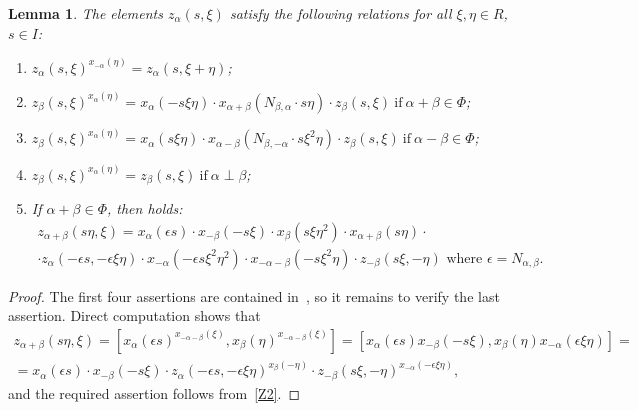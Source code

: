 \documentclass[oneside, 8pt]{amsart}
\newtheorem{lemma}{Lemma}
\theoremstyle{remark}
\theoremstyle{definition}
\numberwithin{lemma}{section}
\numberwithin{prop}{section}
\numberwithin{corollary}{section}
\numberwithin{equation}{section}
\begin{document}
\begin{lemma}\label{Zrels} The elements $z_\alpha(s, \xi)$ satisfy the following relations for all $\xi, \eta\in R$, $s\in I$:
\begin{enumerate} 
\item\label{Z1} $z_{\alpha}(s, \xi) ^ {x_{-\alpha}(\eta)} = z_{\alpha}(s, \xi + \eta)$;
\item\label{Z2} $z_{\beta}(s, \xi) ^ {x_{\alpha}(\eta)} = x_{\alpha} (- s\xi \eta) \cdot x_{\alpha+\beta} (N_{\beta, \alpha}\cdot s\eta)     \cdot z_{\beta}(s, \xi)\ \text{if}\ \alpha + \beta \in \Phi$;
\item\label{Z3} $z_{\beta}(s, \xi) ^ {x_{\alpha}(\eta)} = x_{\alpha} (s\xi \eta) \cdot x_{\alpha-\beta} (N_{\beta,-\alpha}\cdot s\xi^2\eta) \cdot z_{\beta}(s, \xi)\ \text{if}\ \alpha - \beta \in \Phi$;

\item\label{Z4} $z_{\beta}(s, \xi) ^ {x_{\alpha}(\eta)} = z_{\beta}(s, \xi)\ \text{if}\ \alpha\perp\beta$;
\item If $\alpha+\beta\in\Phi$, then holds:
\begin{multline} \label{Z5} z_{\alpha+\beta}(s\eta, \xi) = x_\alpha(\epsilon s)\cdot x_{-\beta}(-s\xi) \cdot x_{\beta}(s\xi\eta^2) \cdot x_{\alpha+\beta}(s \eta) \cdot \\ \cdot z_\alpha(-\epsilon s, -\epsilon \xi\eta) \cdot
  x_{-\alpha}(-\epsilon s\xi^2\eta^2) \cdot x_{-\alpha-\beta}(- s \xi^2 \eta) \cdot z_{-\beta}(s\xi, -\eta)\text{ where $\epsilon = N_{\alpha,\beta}$.}\end{multline}
\end{enumerate} \end{lemma}
\begin{proof}
The first four assertions are contained in~\cite[Lemma~9]{S15}, so it remains to verify the last assertion.
Direct computation shows that
\begin{multline} \nonumber
  z_{\alpha+\beta}(s\eta, \xi) = [x_\alpha(\epsilon s)^{x_{-\alpha-\beta}(\xi)}, x_\beta(\eta)^{x_{-\alpha-\beta}(\xi)}] =
  [x_\alpha(\epsilon s) x_{-\beta}(-s\xi), x_{\beta}(\eta) x_{-\alpha}(\epsilon \xi\eta)] = \\ 
  = x_\alpha(\epsilon s) \cdot x_{-\beta}(-s\xi) \cdot z_\alpha(-\epsilon s, -\epsilon \xi\eta)^{x_{\beta}(-\eta)} \cdot z_{-\beta}(s\xi, -\eta)^{x_{-\alpha}(-\epsilon \xi\eta)},
\end{multline} 
and the required assertion follows from~\eqref{Z2}.
\end{proof}
\end{document}

